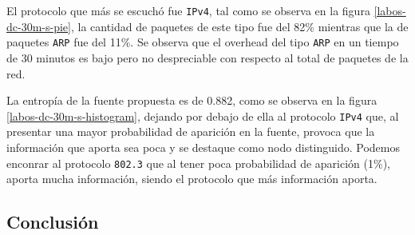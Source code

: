 \documentclass[final,inline,a4paper,narroweqnarray]{ieee}
\begin{document}
  El protocolo que más se escuchó fue \texttt{IPv4}, tal como se
  observa en la figura \ref{labos-dc-30m-s-pie}, la cantidad de
  paquetes  de este tipo fue del 82\% mientras que la de paquetes
  \texttt{ARP} fue del 11\%. Se observa que el overhead del tipo \texttt{ARP} 
  en un tiempo de 30 minutos es bajo pero no despreciable con respecto al 
  total de paquetes de la red.

  La entropía de la fuente propuesta es de 0.882, como se observa en la
  figura \ref{labos-dc-30m-s-histogram}, dejando por debajo de ella al
  protocolo \texttt{IPv4} que, al presentar una mayor probabilidad de
  aparición en la fuente, provoca que la información que aporta sea
  poca y se destaque como nodo distinguido. Podemos enconrar al protocolo 
  \texttt{802.3} que al tener poca probabilidad de aparición
  (1\%), aporta mucha información, siendo el protocolo que más información
  aporta.
 

    \subsection{Conclusión}

\end{document}
